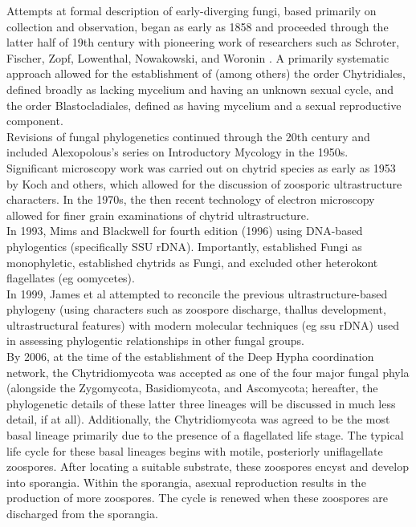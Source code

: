 \indent Attempts at formal description of early-diverging fungi, based primarily on collection and observation, began as early as 1858 and proceeded through the latter half of 19th century with pioneering work of researchers such as Schroter, Fischer, Zopf, Lowenthal, Nowakowski, and Woronin \cite{lwerPhycomyces}. A primarily systematic approach allowed for the establishment of (among others) the order Chytridiales, defined broadly as lacking mycelium and having an unknown sexual cycle, and the order Blastocladiales, defined as having mycelium and a sexual reproductive component.\\
\indent Revisions of fungal phylogenetics continued through the 20th century and included Alexopolous's series on Introductory Mycology in the 1950s.\\
\indent Significant microscopy work was carried out on chytrid species as early as 1953 by Koch and others, which allowed for the discussion of zoosporic ultrastructure characters. In the 1970s, the then recent technology of electron microscopy allowed for finer grain examinations of chytrid ultrastructure.\\
\indent In 1993, Mims and Blackwell for fourth edition (1996) using DNA-based phylogentics (specifically SSU rDNA). Importantly, established Fungi as monophyletic, established chytrids as Fungi, and excluded other heterokont flagellates (eg oomycetes).\\
\indent In 1999, James et al attempted to reconcile the previous ultrastructure-based phylogeny (using characters such as zoospore discharge, thallus development, ultrastructural features) with modern molecular techniques (eg ssu rDNA) used in assessing phylogentic relationships in other fungal groups.\\
\indent By 2006, at the time of the establishment of the Deep Hypha coordination network, the Chytridiomycota was accepted as one of the four major fungal phyla (alongside the Zygomycota, Basidiomycota, and Ascomycota; hereafter, the phylogenetic details of these latter three lineages will be discussed in much less detail, if at all). Additionally, the Chytridiomycota was agreed to be the most basal lineage primarily due to the presence of a flagellated life stage. The typical life cycle for these basal lineages begins with motile, posteriorly uniflagellate zoospores. After locating a suitable substrate, these zoospores encyst and develop into sporangia. Within the sporangia, asexual reproduction results in the production of more zoospores. The cycle is renewed when these zoospores are discharged from the sporangia.\\
